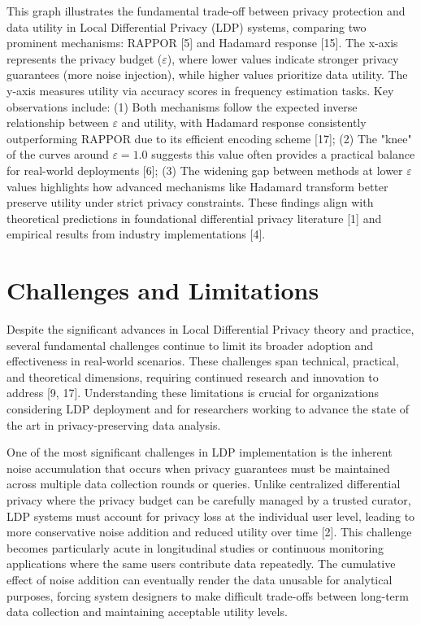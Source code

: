 \documentclass[conference]{IEEEtran}
\begin{document}
This graph illustrates the fundamental trade-off between privacy protection and data utility in Local Differential Privacy (LDP) systems, comparing two prominent mechanisms: RAPPOR [5] and Hadamard response [15]. The x-axis represents the privacy budget ($\varepsilon$), where lower values indicate stronger privacy guarantees (more noise injection), while higher values prioritize data utility. The y-axis measures utility via accuracy scores in frequency estimation tasks. Key observations include: (1) Both mechanisms follow the expected inverse relationship between $\varepsilon$ and utility, with Hadamard response consistently outperforming RAPPOR due to its efficient encoding scheme [17]; (2) The "knee" of the curves around $\varepsilon = 1.0$ suggests this value often provides a practical balance for real-world deployments [6]; (3) The widening gap between methods at lower $\varepsilon$ values highlights how advanced mechanisms like Hadamard transform better preserve utility under strict privacy constraints. These findings align with theoretical predictions in foundational differential privacy literature [1] and empirical results from industry implementations [4].

\section{Challenges and Limitations}
Despite the significant advances in Local Differential Privacy theory and practice, several fundamental challenges continue to limit its broader adoption and effectiveness in real-world scenarios. These challenges span technical, practical, and theoretical dimensions, requiring continued research and innovation to address [9, 17]. Understanding these limitations is crucial for organizations considering LDP deployment and for researchers working to advance the state of the art in privacy-preserving data analysis.

One of the most significant challenges in LDP implementation is the inherent noise accumulation that occurs when privacy guarantees must be maintained across multiple data collection rounds or queries. Unlike centralized differential privacy where the privacy budget can be carefully managed by a trusted curator, LDP systems must account for privacy loss at the individual user level, leading to more conservative noise addition and reduced utility over time [2]. This challenge becomes particularly acute in longitudinal studies or continuous monitoring applications where the same users contribute data repeatedly. The cumulative effect of noise addition can eventually render the data unusable for analytical purposes, forcing system designers to make difficult trade-offs between long-term data collection and maintaining acceptable utility levels.
\end{document}
